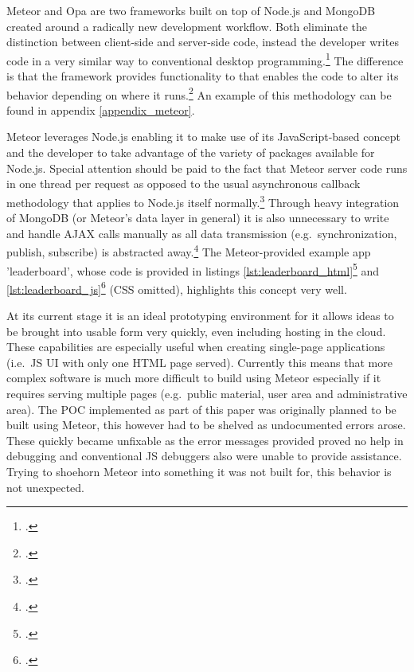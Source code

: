 \begin{appendices}
\begin{subappendices}
\label{appendix_meteor}
\FloatBarrier
Meteor and Opa are two frameworks built on top of Node.js and MongoDB created around a radically new development workflow. Both eliminate the distinction between client-side and server-side code, instead the developer writes code in a very similar way to conventional desktop programming.\footcite[Cf.][]{meteorDocs} The difference is that the framework provides functionality to that enables the code to alter its behavior depending on where it runs.\footcite[Cf.][]{meteorDocs} An example of this methodology can be found in appendix \ref{appendix_meteor}.

Meteor leverages Node.js enabling it to make use of its JavaScript-based concept and  the developer to take advantage of the variety of packages available for Node.js. Special attention should be paid to the fact that Meteor server code runs in one thread per request as opposed to the usual asynchronous callback methodology that applies to Node.js itself normally.\footcite[Cf.][]{meteorDocs} Through heavy integration of MongoDB (or Meteor's data layer in general) it is also unnecessary to write and handle AJAX calls manually as all data transmission (e.g.\ synchronization, publish, subscribe) is abstracted away.\footcite[Cf.][]{meteorDocs} The Meteor-provided example app 'leaderboard', whose code is provided in listings \ref{lst:leaderboard_html}\footcite[Cf.][]{leaderboard} and \ref{lst:leaderboard_js}\footcite[Cf.][]{leaderboard} (CSS omitted), highlights this concept very well.

At its current stage it is an ideal prototyping environment for it allows ideas to be brought into usable form very quickly, even including hosting in the cloud. These capabilities are especially useful when creating single-page applications (i.e.\ JS UI with only one HTML page served). Currently this means that more complex software is much more difficult to build using Meteor especially if it requires serving multiple pages (e.g.\ public material, user area and administrative area). The POC implemented as part of this paper was originally planned to be built using Meteor, this however had to be shelved as undocumented errors arose. These quickly became unfixable as the error messages provided proved no help in debugging and conventional JS debuggers also were unable to provide assistance.
Trying to shoehorn Meteor into something it was not built for, this behavior is not unexpected.


\end{subappendices}
\end{appendices}
